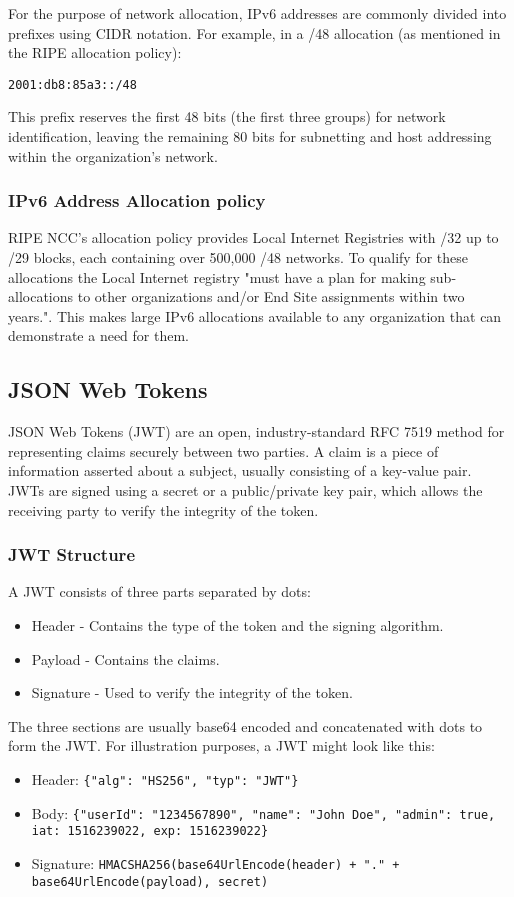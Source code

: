 \documentclass[12pt]{article}
\begin{document}
\noindent For the purpose of network allocation, IPv6 addresses are commonly divided into prefixes using CIDR notation. 
For example, in a /48 allocation (as mentioned in the RIPE allocation policy):
\begin{verbatim}
2001:db8:85a3::/48
\end{verbatim}
This prefix reserves the first 48 bits (the first three groups) for network identification, 
leaving the remaining 80 bits for subnetting and host addressing within the organization's network.
\subsubsection{IPv6 Address Allocation policy}
RIPE NCC's allocation policy provides Local Internet Registries with /32 up to /29 blocks, each containing over 500,000 /48 networks.
To qualify for these allocations the Local Internet registry 
"must have a plan for making sub-allocations to other organizations and/or End Site assignments within two years."\cite{IPv6AddressAllocation}.
This makes large IPv6 allocations available to any organization that can demonstrate a need for them.

\subsection{JSON Web Tokens}
JSON Web Tokens (JWT)\cite{jonesJSONWebToken2015} are an open, industry-standard RFC 7519 method for representing claims securely between two parties.
A claim is a piece of information asserted about a subject, usually consisting of a key-value pair.
JWTs are signed using a secret or a public/private key pair, which allows the receiving party to verify the integrity of the token.
\subsubsection{JWT Structure}
A JWT consists of three parts separated by dots:
\begin{itemize}
    \item Header - Contains the type of the token and the signing algorithm.
    \item Payload - Contains the claims.
    \item Signature - Used to verify the integrity of the token.
\end{itemize}
The three sections are usually base64 encoded and concatenated with dots to form the JWT.
For illustration purposes, a JWT might look like this:
\begin{itemize}
    \item Header: \texttt{\{"alg": "HS256", "typ": "JWT"\}}
    \item Body: \texttt{\{"userId": "1234567890", "name": "John Doe", "admin": true, iat: 1516239022, exp: 1516239022\}}
    \item Signature: \texttt{HMACSHA256(base64UrlEncode(header) + "." + \\ base64UrlEncode(payload), secret)}
\end{itemize}
\end{document}
